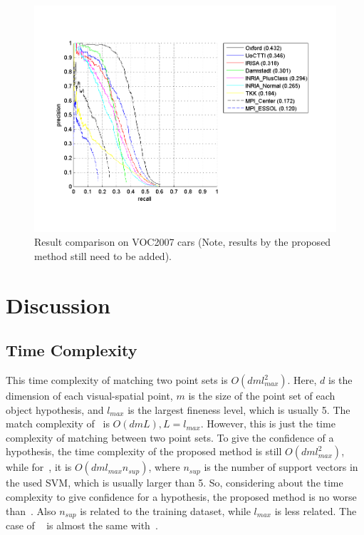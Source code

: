 \begin{figure}[!htbp]
\includegraphics[width=1.7\textwidth,bb=0 0 961 720]{v07car.png}
\caption[Result comparison on VOC2007 cars]{Result comparison on VOC2007 cars ({\color{red}Note, results by the proposed method still need to be added}).}
\label{fig:c57}
\end{figure}
\FloatBarrier

\section{Discussion}
\label{dis5}
\subsection{Time Complexity}
This time complexity of matching two point sets is $O(dml_{max}^2)$. Here, $d$ is the dimension of each visual-spatial point, $m$ is the size of the point set of each object hypothesis, and $l_{max}$ is the largest fineness level, which is usually 5. The match complexity of~\citep{pmk} is $O(dmL), L=l_{max}$. However, this is just the time complexity of matching between two point sets. To give the confidence of a hypothesis, the time complexity of the proposed method is still $O(dml_{max}^2)$, while for~\citep{pmk}, it is $O(dml_{max}n_{sup})$, where $n_{sup}$ is the number of support vectors in the used SVM, which is usually larger than 5. So, considering about the time complexity to give confidence for a hypothesis, the proposed method is no worse than~\citep{pmk}. Also $n_{sup}$ is related to the training dataset, while $l_{max}$ is less related. The case of ~\citep{spmk} is almost the same with~\citep{pmk}.

